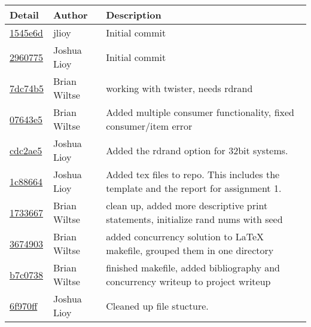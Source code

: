 \begin{tabular}{l l l}\textbf{Detail} & \textbf{Author} & \textbf{Description}\\\hline
\href{https://github.com/jlioy/group11repo/commit/1545e6d0da222412e8fa7eefd1a4cabe77a94c43}{1545e6d} & jlioy & Initial commit\\\hline
\href{https://github.com/jlioy/group11repo/commit/2960775caca5e9dca24141a3ed4fc61f799ec04b}{2960775} & Joshua Lioy & Initial commit\\\hline
\href{https://github.com/jlioy/group11repo/commit/7dc74b5a1b9a45379d309e0f2e220002ac19ce53}{7dc74b5} & Brian Wiltse & working with twister, needs rdrand\\\hline
\href{https://github.com/jlioy/group11repo/commit/07643e55d750324a3f677efa92d7c7fe53ec1c59}{07643e5} & Brian Wiltse & Added multiple consumer functionality, fixed consumer/item error\\\hline
\href{https://github.com/jlioy/group11repo/commit/cdc2ae515d4db42998bf527f9df655e20384c427}{cdc2ae5} & Joshua Lioy & Added the rdrand option for 32bit systems.\\\hline
\href{https://github.com/jlioy/group11repo/commit/1c8866445e7569af74bd8ecf7cd21490e5e38cea}{1c88664} & Joshua Lioy & Added tex files to repo. This includes the template and the report for assignment 1.\\\hline
\href{https://github.com/jlioy/group11repo/commit/1733667d34ed7264b7bf1a4ae4e7eaa8bdc41e2f}{1733667} & Brian Wiltse & clean up, added more descriptive print statements, initialize rand nums with seed\\\hline
\href{https://github.com/jlioy/group11repo/commit/36749030438260f5dc2e578b7316a61a482e0267}{3674903} & Brian Wiltse & added concurrency solution to LaTeX makefile, grouped them in one directory\\\hline
\href{https://github.com/jlioy/group11repo/commit/b7c073897daae1bb2e389c2e55f54adeee2b03d0}{b7c0738} & Brian Wiltse & finished makefile, added bibliography and concurrency writeup to project writeup\\\hline
\href{https://github.com/jlioy/group11repo/commit/6f970ff807faa2f847c7cf779ea96ac5e0a9efd4}{6f970ff} & Joshua Lioy & Cleaned up file stucture.\\\hline\end{tabular}
